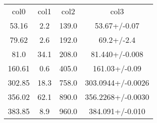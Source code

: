 \begin{table}
\begin{tabular}{cccc}
col0 & col1 & col2 & col3 \\
53.16 & 2.2 & 139.0 & 53.67+/-0.07 \\
79.62 & 2.6 & 192.0 & 69.2+/-2.4 \\
81.0 & 34.1 & 208.0 & 81.440+/-0.008 \\
160.61 & 0.6 & 405.0 & 161.03+/-0.09 \\
302.85 & 18.3 & 758.0 & 303.0944+/-0.0026 \\
356.02 & 62.1 & 890.0 & 356.2268+/-0.0030 \\
383.85 & 8.9 & 960.0 & 384.091+/-0.010 \\
\end{tabular}
\end{table}
